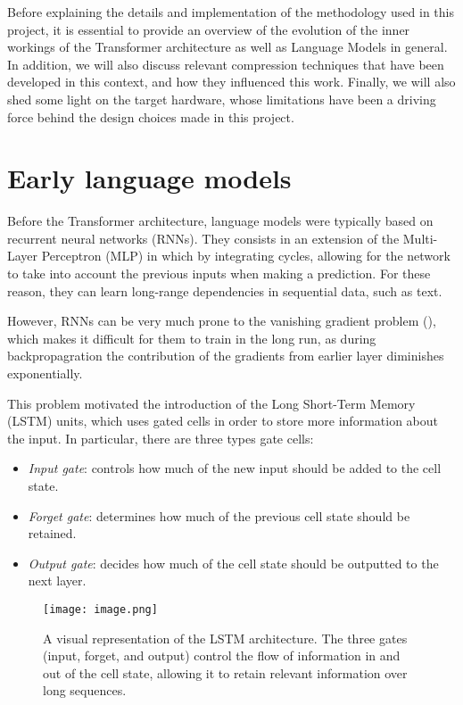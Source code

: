 Before explaining the details and implementation of the methodology used in this project, it is essential to provide an overview of the evolution of the inner workings of the Transformer architecture as well as Language Models in general. In addition, we will also discuss relevant compression techniques that have been developed in this context, and how they influenced this work.
Finally, we will also shed some light on the target hardware, whose limitations have been a driving force behind the design choices made in this project.

\section{Early language models}
Before the Transformer architecture, language models were typically based on recurrent neural networks (RNNs). They consists in an extension of the Multi-Layer Perceptron (MLP) in which by integrating cycles, allowing for the network to take into account the previous inputs when making a prediction. For these reason, they can learn long-range dependencies in sequential data, such as text.

However, RNNs can be very much prone to the vanishing gradient problem (\cite{rnn_details}), which makes it difficult for them to train in the long run, as during backpropagration the contribution of the gradients from earlier layer diminishes exponentially. 

This problem motivated the introduction of the Long Short-Term Memory (LSTM) units, which uses gated cells in order to store more information about the input. In particular, there are three types gate cells:
\begin{itemize}
    \item \textit{Input gate}: controls how much of the new input should be added to the cell state.
    \item \textit{Forget gate}: determines how much of the previous cell state should be retained.
    \item \textit{Output gate}: decides how much of the cell state should be outputted to the next layer.
\end{itemize}
\begin{figure}[!htbp]
    \centering
    \texttt{[image: image.png]}
    \caption{A visual representation of the LSTM architecture. The three gates (input, forget, and output) control the flow of information in and out of the cell state, allowing it to retain relevant information over long sequences.}
    \label{fig:your-label}
\end{figure}


